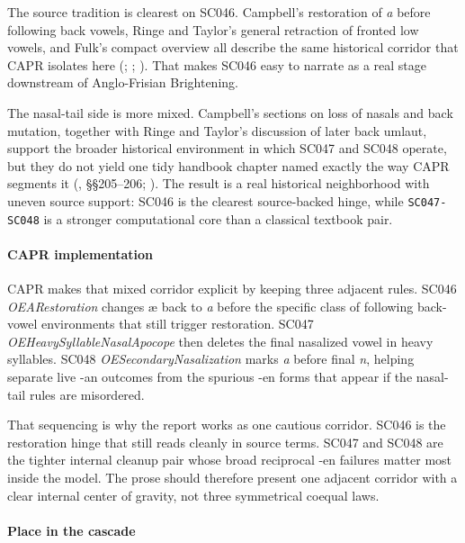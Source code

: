 \documentclass[
  british,
  a4paper,
]{article}
\begin{document}
The source tradition is clearest on SC046. Campbell's restoration of
\emph{a} before following back vowels, Ringe and Taylor's general
retraction of fronted low vowels, and Fulk's compact overview all
describe the same historical corridor that CAPR isolates here
(;
;
). That makes SC046 easy
to narrate as a real stage downstream of Anglo-Frisian Brightening.

The nasal-tail side is more mixed. Campbell's sections on loss of nasals
and back mutation, together with Ringe and Taylor's discussion of later
back umlaut, support the broader historical environment in which SC047
and SC048 operate, but they do not yield one tidy handbook chapter named
exactly the way CAPR segments it (, §§205--206; ). The result is a real historical neighborhood
with uneven source support: SC046 is the clearest source-backed hinge,
while \texttt{SC047-SC048} is a stronger computational core than a
classical textbook pair.

\paragraph{CAPR implementation}\label{capr-implementation-29}

CAPR makes that mixed corridor explicit by keeping three adjacent rules.
SC046 \emph{OEARestoration} changes æ back to \emph{a} before the
specific class of following back-vowel environments that still trigger
restoration. SC047 \emph{OEHeavySyllableNasalApocope} then deletes the
final nasalized vowel in heavy syllables. SC048
\emph{OESecondaryNasalization} marks \emph{a} before final \emph{n},
helping separate live -an outcomes from the spurious -en forms that
appear if the nasal-tail rules are misordered.

That sequencing is why the report works as one cautious corridor. SC046
is the restoration hinge that still reads cleanly in source terms. SC047
and SC048 are the tighter internal cleanup pair whose broad reciprocal
-en failures matter most inside the model. The prose should therefore
present one adjacent corridor with a clear internal center of gravity,
not three symmetrical coequal laws.

\paragraph{Place in the cascade}\label{place-in-the-cascade-29}
\end{document}
